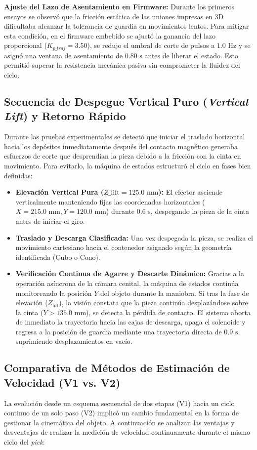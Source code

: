 \documentclass[12pt, a4paper]{report}
\begin{document}
\textbf{Ajuste del Lazo de Asentamiento en Firmware:} 
Durante los primeros ensayos se observó que la fricción estática de las uniones impresas en 3D dificultaba alcanzar la tolerancia de guardia en movimientos lentos. Para mitigar esta condición, en el firmware embebido se ajustó la ganancia del lazo proporcional ($K_{p\_traj} = 3.50$), se redujo el umbral de corte de pulsos a $1.0\text{ Hz}$ y se asignó una ventana de asentamiento de $0.80\text{ s}$ antes de liberar el estado. Esto permitió superar la resistencia mecánica pasiva sin comprometer la fluidez del ciclo.

\subsection{Secuencia de Despegue Vertical Puro (\textit{Vertical Lift}) y Retorno Rápido}
Durante las pruebas experimentales se detectó que iniciar el traslado horizontal hacia los depósitos inmediatamente después del contacto magnético generaba esfuerzos de corte que desprendían la pieza debido a la fricción con la cinta en movimiento. Para evitarlo, la máquina de estados estructuró el ciclo en fases bien definidas:
\begin{itemize}
    \item \textbf{Elevación Vertical Pura ($Z\_{\text{lift}} = 125.0\text{ mm}$):} El efector asciende verticalmente manteniendo fijas las coordenadas horizontales ($X=215.0\text{ mm}, Y=120.0\text{ mm}$) durante $0.6\text{ s}$, despegando la pieza de la cinta antes de iniciar el giro.
    \item \textbf{Traslado y Descarga Clasificada:} Una vez despegada la pieza, se realiza el movimiento cartesiano hacia el contenedor asignado según la geometría identificada (Cubo o Cono).
    \item \textbf{Verificación Continua de Agarre y Descarte Dinámico:} Gracias a la operación asíncrona de la cámara cenital, la máquina de estados continúa monitoreando la posición $Y$ del objeto durante la maniobra. Si tras la fase de elevación ($Z_{\text{lift}}$), la visión constata que la pieza continúa desplazándose sobre la cinta ($Y > 135.0\text{ mm}$), se detecta la pérdida de contacto. El sistema aborta de inmediato la trayectoria hacia las cajas de descarga, apaga el solenoide y regresa a la posición de guardia mediante una trayectoria directa de $0.9\text{ s}$, suprimiendo desplazamientos en vacío.
\end{itemize}

\subsection{Comparativa de Métodos de Estimación de Velocidad (V1 vs. V2)}
La evolución desde un esquema secuencial de dos etapas (V1) hacia un ciclo continuo de un solo paso (V2) implicó un cambio fundamental en la forma de gestionar la cinemática del objeto. A continuación se analizan las ventajas y desventajas de realizar la medición de velocidad continuamente durante el mismo ciclo del \textit{pick}:
\end{document}
